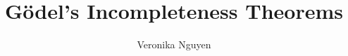 \documentclass[BCOR=4mm]{scrbook}
\date{\DTMusedate{date}}
\title{Gödel's Incompleteness Theorems}
\author{Veronika Nguyen}
\numberwithin{equation}{section}
\theoremstyle{definition}
\begin{document}
    \frontmatter
    \maketitle
	
    

    \tableofcontents

    \mainmatter
    
    
    
    
    
    
    

    \appendix

	\nocite{*}
    \printbibliography
\end{document}
